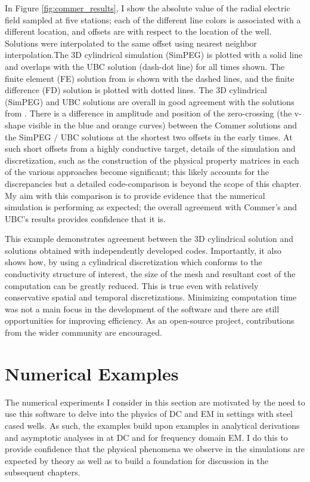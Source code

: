 In Figure \ref{fig:commer_results}, I show the absolute value of the radial electric field sampled at five stations; each of the different line colors is associated with a different location, and offsets are with respect to the location of the well. Solutions were interpolated to the same offset using nearest neighbor interpolation.The 3D cylindrical simulation (SimPEG) is plotted with a solid line and overlaps with the UBC solution (dash-dot line) for all times shown. The finite element (FE) solution from \cite{Commer2015} is shown with the dashed lines, and the finite difference (FD) solution is plotted with dotted lines. The 3D cylindrical (SimPEG) and UBC solutions are overall in good agreement with the solutions from \cite{Commer2015}. There is a difference in amplitude and position of the zero-crossing (the v-shape visible in the blue and orange curves) between the Commer solutions and the SimPEG / UBC solutions at the shortest two offsets in the early times. At such short offsets from a highly conductive target, details of the simulation and discretization, such as the construction of the physical property matrices in each of the various approaches become significant; this likely accounts for the discrepancies but a detailed code-comparison is beyond the scope of this chapter. My aim with this comparison is to provide evidence that the numerical simulation is performing as expected; the overall agreement with Commer's and UBC's results provides confidence that it is.




This example demonstrates agreement between the 3D cylindrical solution and solutions obtained with independently developed codes. Importantly, it also shows how, by using a cylindrical discretization which conforms to the conductivity structure of interest, the size of the mesh and resultant cost of the computation can be greatly reduced. This is true even with relatively conservative spatial and temporal discretizations. Minimizing computation time was not a main focus in the development of the software and there are still opportunities for improving efficiency. As an open-source project, contributions from the wider community are encouraged.
\section{Numerical Examples}
\label{sec:numerical_examples}

The numerical experiments I consider in this section are motivated by the need to use this software to delve into the physics of DC and EM in settings with steel cased wells. As such, the examples build upon examples in analytical derivations and asymptotic analyses in \cite{Kaufman1990, Kaufman1993} at DC and \cite{Augustin1989} for frequency domain EM. I do this to provide confidence that the physical phenomena we observe in the simulations are expected by theory as well as to build a foundation for discussion in the subsequent chapters.
